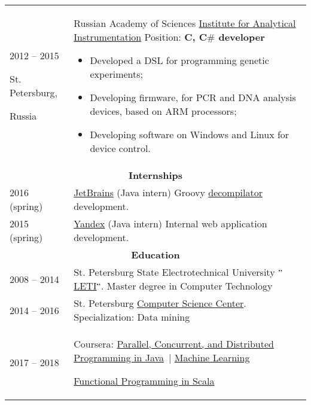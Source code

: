 \documentclass{article}
\begin{document}
\begin{longtable}{p{0.00in}p{0.00in}p{0.0in}p{0.00in}p{0.00in}}
\multicolumn{2}{p{\dimexpr1.00in+2\tabcolsep\relax}}{2012 -- 2015 \par St. Petersburg,\par Russia} &
\multicolumn{3}{p{\dimexpr5.85in+4\tabcolsep\relax}}{Russian Academy of Sciences \href{http://iairas.ru/en/}{Institute for Analytical Instrumentation}
Position: \textbf{C, C$\#$ developer} \par
\begin{itemize}
    \item Developed a DSL for programming genetic experiments;
    \item Developing firmware, for PCR and DNA analysis devices, based on ARM processors;
    \item Developing software on Windows and Linux for device control.
\end{itemize}
} \\

\multicolumn{5}{c}{\textbf{Internships}} \\

\multicolumn{2}{p{\dimexpr1.00in+2\tabcolsep\relax}}{2016 (spring)} &
\multicolumn{3}{p{\dimexpr5.85in+4\tabcolsep\relax}}{\href{https://www.jetbrains.com/}{JetBrains} (Java intern)
    Groovy \href{https://github.com/dehasi/groovy-dc}{decompilator} development.
} \\

\multicolumn{2}{p{\dimexpr1.00in+2\tabcolsep\relax}}{2015 (spring)} &
\multicolumn{3}{p{\dimexpr5.85in+4\tabcolsep\relax}}{\href{https://yandex.com/company/}{Yandex} (Java intern)
    Internal web application development.
} \\

\multicolumn{5}{c}{ \textbf{Education}} \\

\multicolumn{2}{p{\dimexpr1.00in+2\tabcolsep\relax}}{2008 -- 2014} &
\multicolumn{3}{p{\dimexpr5.85in+4\tabcolsep\relax}}{St. Petersburg State Electrotechnical
   University $"$\href{https://etu.ru/en/university/}{LETI}$"$. Master degree in Computer Technology
} \\

\multicolumn{2}{p{\dimexpr1.00in+2\tabcolsep\relax}}{2014 -- 2016} &
\multicolumn{3}{p{\dimexpr5.85in+4\tabcolsep\relax}}{St. Petersburg
    \href{https://compscicenter.ru/students/714/}{Computer Science Center}. Specialization: Data mining
} \\

\multicolumn{2}{p{\dimexpr1.00in+2\tabcolsep\relax}}{2017 -- 2018} &
\multicolumn{3}{p{\dimexpr5.85in+4\tabcolsep\relax}}{Coursera:
\href{https://www.coursera.org/account/accomplishments/specialization/certificate/HEKRFB8RMKUD}{Parallel, Concurrent, and Distributed Programming in Java}\ $\vert$
    \href{https://www.coursera.org/account/accomplishments/verify/3YL6SFFSLZCT}{Machine Learning} \par
    \href{https://www.coursera.org/account/accomplishments/specialization/certificate/GAR3792UCR6W}{Functional Programming in Scala}
\par} \\


\end{longtable}
\end{document}
